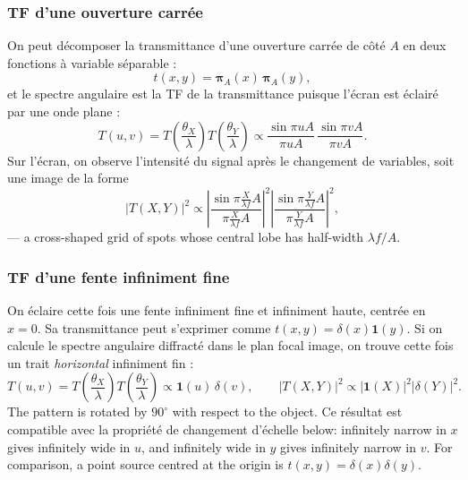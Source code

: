 \subsubsection{TF d'une ouverture carrée}
On peut décomposer la transmittance d'une ouverture carrée de côté $A$ en deux
fonctions à variable séparable :
\begin{equation*}
  t(x,y) = \bm{\pi}_A(x)\, \bm{\pi}_A(y),
\end{equation*}
et le spectre angulaire est la TF de la transmittance puisque l'écran est
éclairé par une onde plane :
\begin{equation*}
  T(u,v) = T\!\left(\frac{\theta_X}{\lambda}\right)
           T\!\left(\frac{\theta_Y}{\lambda}\right)
         \propto \frac{\sin \pi u A}{\pi u A}\,\frac{\sin \pi v A}{\pi v A}.
\end{equation*}
Sur l'écran, on observe l'intensité du signal après le changement de variables,
soit une image de la forme
\begin{equation*}
  |T(X,Y)|^2 \propto
    \left|\frac{\sin \pi \frac{X}{\lambda f}A}{\pi \frac{X}{\lambda f}A}\right|^2
    \left|\frac{\sin \pi \frac{Y}{\lambda f}A}{\pi \frac{Y}{\lambda f}A}\right|^2 ,
\end{equation*}
--- a cross-shaped grid of spots whose central lobe has half-width
$\lambda f / A$.

\subsubsection{TF d'une fente infiniment fine}
On éclaire cette fois une fente infiniment fine et infiniment haute, centrée en
$x=0$. Sa transmittance peut s'exprimer comme $t(x,y) = \delta(x)\mathbf{1}(y)$.
Si on calcule le spectre angulaire diffracté dans le plan focal image, on trouve
cette fois un trait \emph{horizontal} infiniment fin :
\begin{equation*}
  T(u,v) = T\!\left(\frac{\theta_X}{\lambda}\right)
           T\!\left(\frac{\theta_Y}{\lambda}\right)
         \propto \mathbf{1}(u)\,\delta(v),
  \qquad
  |T(X,Y)|^2 \propto |\mathbf{1}(X)|^2 |\delta(Y)|^2 .
\end{equation*}
The pattern is rotated by $90^\circ$ with respect to the object. Ce résultat est
compatible avec la propriété de changement d'échelle below: infinitely narrow
in $x$ gives infinitely wide in $u$, and infinitely wide in $y$ gives
infinitely narrow in $v$. For comparison, a point source centred at the origin
is $t(x,y) = \delta(x)\delta(y)$.

